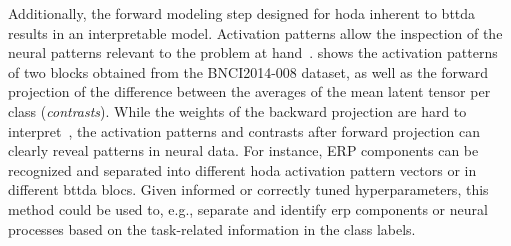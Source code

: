 \documentclass[twocolumn]{article}
\begin{document}

Additionally, the forward modeling step designed for \ac{hoda} inherent to
\ac{bttda} results in an interpretable model.
Activation patterns allow the inspection of the
neural patterns relevant to the problem at hand~\cite{Haufe2014}.
shows the activation patterns
of two blocks obtained from the BNCI2014-008 dataset, as well as the forward
projection of the difference between the averages of the mean latent tensor per
class (\emph{contrasts}).
While the weights of the backward projection are
hard to interpret~\cite{Haufe2014},
the activation patterns and contrasts after forward projection can clearly reveal
patterns in neural data.
For instance, ERP components can be recognized and separated into different
\ac{hoda} activation pattern vectors or in different \ac{bttda} blocs.
Given informed or correctly tuned hyperparameters, this method could be used to,
e.g., separate and identify \ac{erp} components or neural processes based on the task-related
information in the class labels.
\end{document}
